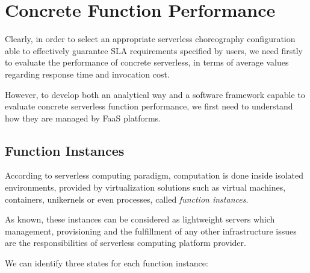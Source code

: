 \documentclass[12pt,a4paper]{report}
\theoremstyle{definition}
\begin{document}
\section{Concrete Function Performance}

Clearly, in order to select an appropriate serverless choreography configuration able to effectively guarantee SLA requirements specified by users, we need firstly to evaluate the performance of concrete serverless, in terms of average values regarding response time and invocation cost.

However, to develop both an analytical way and a software framework capable to evaluate concrete serverless function performance, we first need to understand
how they are managed by FaaS platforms.

\subsection{Function Instances}

According to serverless computing paradigm, computation is done inside isolated environments, provided by virtualization solutions such as virtual machines, containers, unikernels or even processes, called \textit{function instances}.

As known, these instances can be considered as lightweight servers which management, provisioning and the fulfillment of any other infrastructure issues are the responsibilities of serverless computing platform provider.

We can identify three states for each function instance:
\end{document}
